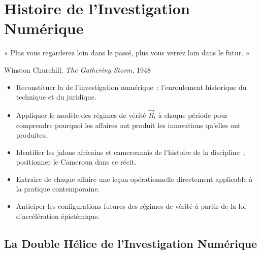 
\chapter{Histoire de l'Investigation Numérique}
\label{chap:histoire}

\epigraph{%
    « Plus vous regarderez loin dans le passé, plus vous verrez loin dans
    le futur. »%
}{Winston Churchill, \textit{The Gathering Storm}, 1948}


\begin{boxobjectifs}
\begin{itemize}
    \item Reconstituer la  de l'investigation
          numérique~: l'enroulement historique du technique et du juridique.
    \item Appliquer le modèle des régimes de vérité $\vec{R}_t$ à chaque
          période pour comprendre pourquoi les affaires ont produit les
          innovations qu'elles ont produites.
    \item Identifier les jalons africains et camerounais de l'histoire
          de la discipline~; positionner le Cameroun dans ce récit.
    \item Extraire de chaque affaire une leçon opérationnelle directement
          applicable à la pratique contemporaine.
    \item Anticiper les configurations futures des régimes de vérité à
          partir de la loi d'accélération épistémique.
\end{itemize}
\end{boxobjectifs}

\bigskip

\section*{La Double Hélice de l'Investigation Numérique}

